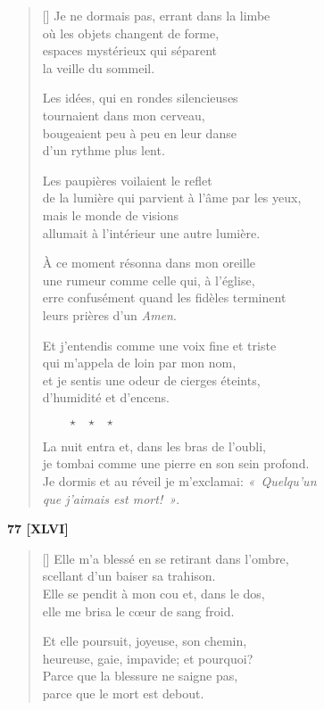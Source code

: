 \documentclass[a4paper,12pt]{book}
\begin{document}
\begin{verse}[\versewidth]
  Je ne dormais pas, errant dans la limbe \\
  où les objets changent de forme, \\
  espaces mystérieux qui séparent \\
  la veille du sommeil.

  Les idées, qui en rondes silencieuses \\
  tournaient dans mon cerveau, \\
  bougeaient peu à peu en leur danse \\
  d'un rythme plus lent.

  Les paupières voilaient le reflet \\
  de la lumière qui parvient à l'âme par les yeux, \\
  mais le monde de visions \\
  allumait à l'intérieur une autre lumière.

  À ce moment résonna dans mon oreille \\
  une rumeur comme celle qui, à l'église, \\
  erre confusément quand les fidèles terminent \\
  leurs prières d'un \emph{Amen}.

  Et j'entendis comme une voix fine et triste \\
  qui m'appela de loin par mon nom, \\
  et je sentis une odeur de cierges éteints, \\
  d'humidité et d'encens.

  $\ \ \ \ \ \ \ \ \ \star \ \ \ \star \ \ \ \star$

  La nuit entra et, dans les bras de l'oubli, \\
  je tombai comme une pierre en son sein profond. \\
  Je dormis et au réveil je m'exclamai: \emph{«~Quelqu'un \\
que j'aimais est mort!~»}.
\end{verse}

\bigskip

\begin{center}
  \textbf{77 [XLVI]}
\end{center}

\settowidth{\versewidth}{Elle m'a blessé en se retirant dans l'ombre,}

\begin{verse}[\versewidth]
  Elle m'a blessé en se retirant dans l'ombre, \\
  scellant d'un baiser sa trahison. \\
  Elle se pendit à mon cou et, dans le dos, \\
  elle me brisa le cœur de sang froid.

  Et elle poursuit, joyeuse, son chemin, \\
  heureuse, gaie, impavide; et pourquoi? \\
  Parce que la blessure ne saigne pas, \\
  parce que le mort est debout.
\end{verse}
\end{document}
